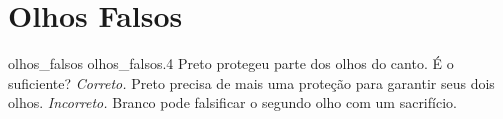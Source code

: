 \chapter{Olhos Falsos}

\emptypage

\problemAnswerDiagram
  {olhos_falsos}
  {olhos_falsos.4}
  {Preto protegeu parte dos olhos do canto. É o suficiente?}
  {\emph{Correto.} Preto precisa de mais uma proteção para garantir seus dois olhos.}
  {\emph{Incorreto.} Branco pode falsificar o segundo olho com um sacrifício.}